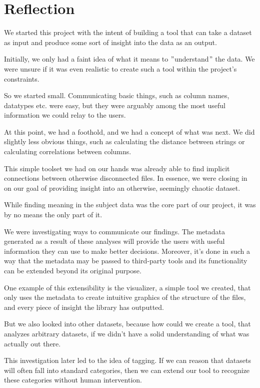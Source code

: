 \section{Reflection}
We started this project with the intent of building a tool that can take a dataset as input
and produce some sort of insight into the data as an output.

Initially, we only had a faint idea of what it means to \("\)understand\("\)
the data.
We were unsure if it was even realistic to create such a tool within the project's constraints.

So we started small.
Communicating basic things, such as column names, datatypes etc.
were easy, but they were arguably among the most useful information we could relay to the users.

At this point, we had a foothold, and we had a concept of what was next.
We did slightly less obvious things, such as calculating the distance between strings or
calculating correlations between columns.

This simple toolset we had on our hands was already able to find implicit connections between
otherwise disconnected files.
In essence, we were closing in on our goal of providing insight into an otherwise, seemingly chaotic
dataset.

While finding meaning in the subject data was the core part of our project,
it was by no means the only part of it.

We were investigating ways to communicate our findings.
The metadata generated as a result of these analyses will provide the users with useful information
they can use to make better decisions.
Moreover, it's done in such a way that the metadata may be passed to third-party tools and
its functionality can be extended beyond its original purpose.

One example of this extensibility is the visualizer, a simple tool we created, that only
uses the metadata to create intuitive graphics of the structure of the files, and
every piece of insight the library has outputted.

But we also looked into other datasets,
because how could we create a tool, that analyzes arbitrary datasets, if
we didn't have a solid understanding of what was actually out there.

This investigation later led to the idea of tagging.
If we can reason that datasets will often fall into standard categories,
then we can extend our tool to recognize these categories without human intervention.

